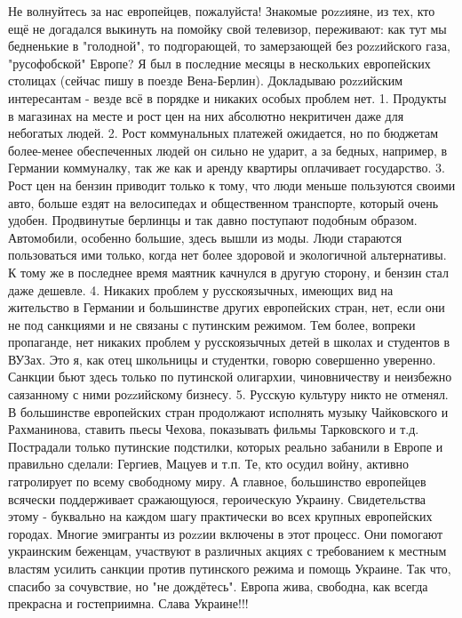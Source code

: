 Не волнуйтесь за нас европейцев, пожалуйста!
Знакомые роzzияне, из тех, кто ещё не догадался выкинуть на помойку свой телевизор, переживают: как тут мы бедненькие в "голодной", то подгорающей, то замерзающей без роzzийского газа, "русофобской" Европе?
Я был в последние месяцы в нескольких европейских столицах (сейчас пишу в поезде Вена-Берлин). Докладываю роzzийским интересантам - везде всё в порядке и никаких особых проблем нет.
1. Продукты в магазинах на месте и рост цен на них абсолютно некритичен даже для небогатых людей.
2. Рост коммунальных платежей ожидается, но по бюджетам более-менее обеспеченных людей он сильно не ударит, а за бедных, например, в Германии коммуналку, так же как и аренду квартиры оплачивает государство.
3. Рост цен на бензин приводит только к тому, что люди меньше пользуются своими авто, больше ездят на велосипедах и общественном транспорте, который очень удобен. Продвинутые берлинцы и так давно поступают подобным образом. Автомобили, особенно большие, здесь вышли из моды. Люди стараются пользоваться ими только, когда нет более здоровой и экологичной альтернативы. К тому же в последнее время маятник качнулся в другую сторону, и бензин стал даже дешевле.
4. Никаких проблем у русскоязычных, имеющих вид на жительство в Германии и большинстве других европейских стран, нет, если они не под санкциями и не связаны с путинским режимом. Тем более, вопреки пропаганде, нет никаких проблем у русскоязычных детей в школах и студентов в ВУЗах. Это я, как отец школьницы и студентки, говорю совершенно уверенно. Санкции бьют здесь только по путинской олигархии, чиновничеству и неизбежно саязанному с ними роzzийскому бизнесу.
5. Русскую культуру никто не отменял. В большинстве европейских стран продолжают исполнять музыку Чайковского и Рахманинова, ставить пьесы Чехова, показывать фильмы Тарковского и т.д. Пострадали только путинские подстилки, которых реально забанили в Европе и правильно сделали: Гергиев, Мацуев и т.п. Те, кто осудил войну, активно гатролирует по всему свободному миру.
А главное, большинство европейцев всячески поддерживает сражающуюся, героическую Украину. Свидетельства этому - буквально на каждом шагу практически во всех крупных европейских городах. Многие эмигранты из роzzии включены в этот процесс. Они помогают украинским беженцам, участвуют в различных акциях с требованием к местным властям усилить санкции против путинского режима и помощь Украине.
Так что, спасибо за сочувствие, но "не дождётесь". Европа жива, свободна, как всегда прекрасна и гостеприимна.
Слава Украине!!!

